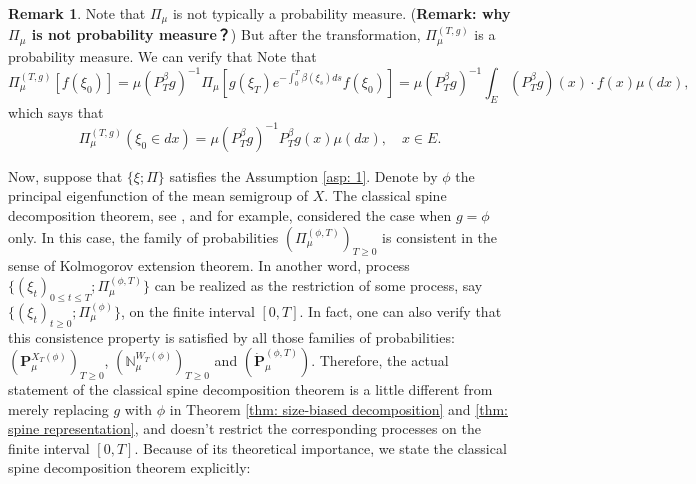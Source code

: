 \documentclass[12pt, a4paper]{amsart}
\theoremstyle{definition}
\newtheorem{rem}[thm]{Remark}
\numberwithin{equation}{section}
\begin{document}
\begin{rem}
\label{rem: initial configuration of transformed process}
	Note that $\Pi_{\mu}$ is not typically a probability measure. ({\bf Remark: why  $\Pi_{\mu}$ is not probability measure？})
	But after the transformation, $\Pi_{\mu}^{(T,g)}$ is a probability measure.
	We can verify that
Note that
\[
	\Pi_{\mu}^{(T,g)} [ f(\xi_0) ]
	= \mu(P^\beta_Tg)^{-1}\Pi_{\mu}[g(\xi_T) e^{-\int_0^T\beta(\xi_s)ds } f(\xi_0) ]
	= \mu(P^\beta_T g)^{-1} 
	\int_E (P^\beta_T g)(x) \cdot f(x)\mu(dx),
\]
which says that
\[
	\Pi_{\mu}^{(T,g)} (\xi_0 \in dx)
	= \mu(P^\beta_T g)^{-1}
    P^\beta_T g(x)\mu(dx),
	\quad x\in E.
\]
\end{rem}

	Now, suppose that $\{\xi; \Pi\}$ satisfies the Assumption \ref{asp: 1}.
	Denote by $\phi$ the principal eigenfunction of the mean semigroup of $X$.
	The classical spine decomposition theorem, see \cite{EckhoffKyprianouWinkel2015Spines}, \cite{EnglanderKyprianou2004Local} and \cite{LiuRenSong2009Llog} for example, considered the case when $g = \phi$ only.
	In this case, the family of probabilities $(\Pi_{\mu}^{(\phi,T)})_{T\geq 0}$ is consistent in the sense of Kolmogorov extension theorem.
	In another word, process $\{(\xi_t)_{0\leq t\leq T}; \Pi_{\mu}^{(\phi,T)} \}$ can be realized as the restriction of some process, say $\{(\xi_t)_{t\geq 0}; \Pi_{\mu}^{(\phi)}\}$, on the finite interval $[0,T]$.
	In fact, one can also verify that this consistence property is satisfied by all those families of probabilities: $(\mathbf P_\mu^{X_T(\phi)} )_{T\geq 0}$, $(\mathbb N^{W_T(\phi)}_\mu)_{T\geq 0}$ and $(\dot {\mathbf P}^{(\phi,T)}_\mu)$.
	Therefore, the actual statement of the classical spine decomposition theorem is a little different from merely replacing $g$ with $\phi$ in Theorem \ref{thm: size-biased decomposition} and \ref{thm: spine representation}, and doesn't restrict the corresponding processes on the finite interval $[0,T]$.
	Because of its theoretical importance, we state the classical spine decomposition theorem explicitly:
	
\end{document}
